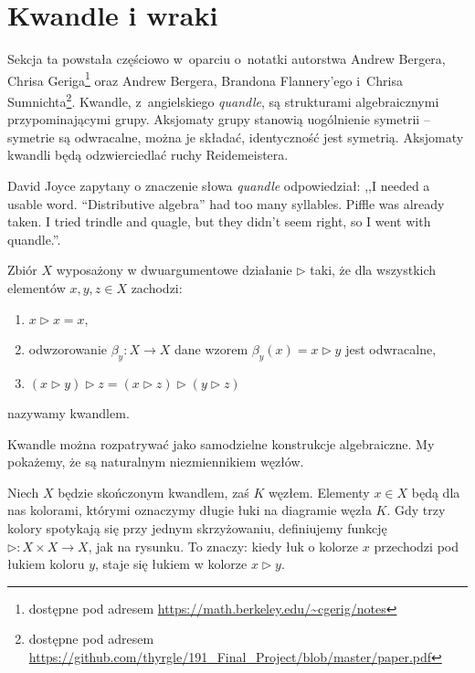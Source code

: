 \section{Kwandle i wraki} %
\label{sec:quandle}
Sekcja ta powstała częściowo w~oparciu o~notatki autorstwa Andrew Bergera, Chrisa Geriga\footnote{dostępne pod adresem \url{https://math.berkeley.edu/~cgerig/notes}} oraz Andrew Bergera, Brandona Flannery'ego i~Chrisa Sumnichta\footnote{dostępne pod adresem \url{https://github.com/thyrgle/191_Final_Project/blob/master/paper.pdf}}.
Kwandle, z~angielskiego \emph{quandle}, są strukturami algebraicznymi przypominającymi grupy.
Aksjomaty grupy stanowią uogólnienie symetrii -- symetrie są odwracalne, można je składać, identyczność jest symetrią.
Aksjomaty kwandli będą odzwierciedlać ruchy Reidemeistera.

David Joyce zapytany o znaczenie słowa \emph{quandle} odpowiedział: ,,I needed a usable word. “Distributive algebra” had too many syllables. Piffle was already taken. I tried trindle and quagle, but they didn’t seem right, so I went with quandle.''.

\begin{definition}[kwandl]
    Zbiór $X$ wyposażony w dwuargumentowe działanie $\triangleright$ taki, że dla wszystkich elementów $x, y, z \in X$ zachodzi:
    \begin{enumerate}
        \item $x \triangleright x = x$,
        \item odwzorowanie $\beta_y \colon X \to X$ dane wzorem $\beta_y(x) = x \triangleright y$ jest odwracalne,
        \item $(x \triangleright y) \triangleright z = (x \triangleright z) \triangleright (y \triangleright z)$
    \end{enumerate}
    nazywamy kwandlem.
\end{definition}

Kwandle można rozpatrywać jako samodzielne konstrukcje algebraiczne.
My pokażemy, że są naturalnym niezmiennikiem węzłów.

Niech $X$ będzie skończonym kwandlem, zaś $K$ węzłem.
Elementy $x \in X$ będą dla nas kolorami, którymi oznaczymy długie łuki na diagramie węzła $K$.
Gdy trzy kolory spotykają się przy jednym skrzyżowaniu, definiujemy funkcję $\triangleright \colon X \times X \to X$, jak na rysunku.
To znaczy: kiedy łuk o kolorze $x$ przechodzi pod łukiem koloru $y$, staje się łukiem w kolorze $x \triangleright y$.

